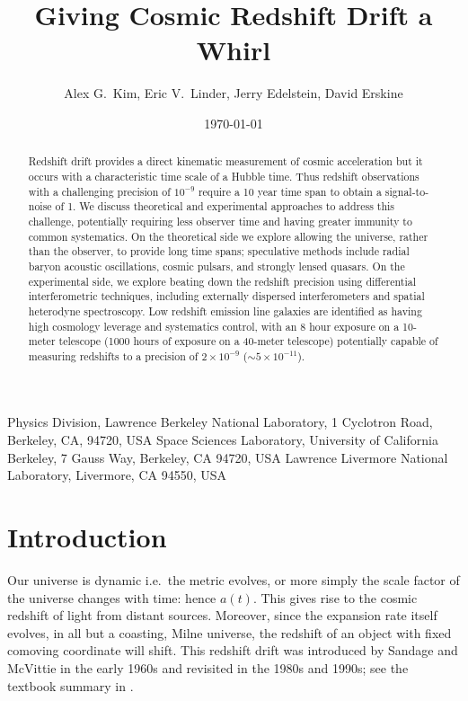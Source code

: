 \documentclass[preprint2, 10pt]{aastex}
\begin{document}
\title{Giving Cosmic Redshift Drift a Whirl} 
\author{Alex G.\ Kim, Eric V.\ Linder, Jerry Edelstein, David Erskine}
{
Physics Division, Lawrence Berkeley National Laboratory, 1 Cyclotron Road, Berkeley, CA, 94720, USA}
{
Space Sciences Laboratory, University of California Berkeley, 7 Gauss Way, Berkeley, CA 94720, USA
}
{
Lawrence Livermore National Laboratory, Livermore,
CA 94550, USA
} 

\begin{abstract} 
Redshift drift provides a direct kinematic measurement of cosmic acceleration 
but it occurs with a characteristic time scale of a Hubble time.  Thus 
redshift observations with a challenging precision of $10^{-9}$ require a 
10 year time span to obtain a signal-to-noise of 1. We discuss theoretical 
and experimental approaches to address this challenge, potentially requiring 
less observer time and having greater immunity to common systematics.  On 
the theoretical side we explore allowing the universe, rather than the 
observer, to provide long time spans; speculative methods include radial 
baryon acoustic oscillations, cosmic pulsars, and strongly lensed quasars. 
On the experimental side, we explore beating down the redshift precision 
using differential interferometric techniques, including externally 
dispersed interferometers and spatial heterodyne spectroscopy. Low 
redshift emission line galaxies are identified as having high cosmology 
leverage and systematics control, with an 8 hour exposure on a 10-meter 
telescope (1000 hours of exposure on a 40-meter telescope) potentially 
capable of measuring redshifts to a precision of $2\times 10^{-9}$ 
($\sim5\times 10^{-11}$). 
\end{abstract}


\date{\today} 


\section{Introduction} \label{Sec:intro} 

Our universe is dynamic i.e.\ the metric evolves, or more simply the 
scale factor of the universe changes with time: hence $a(t)$.  This 
gives rise to the cosmic redshift of light from distant sources.  Moreover, 
since the expansion rate itself evolves, in all but a coasting, Milne 
universe, the redshift of an object with fixed comoving coordinate will shift.  This redshift drift was 
introduced by Sandage \citep{sandage} and McVittie \citep{mcvittie} in the 
early 1960s and revisited in the 1980s and 1990s; see the textbook 
summary in \citet{fpoc}. 
\end{document}
